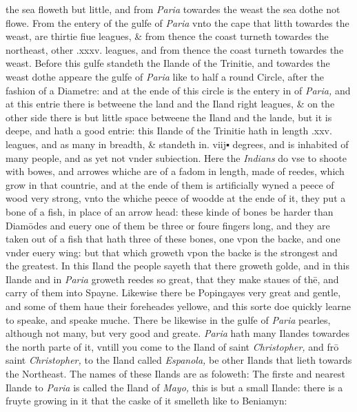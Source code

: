 \documentclass[11pt,twoside]{article}\makeatletter
\begin{document}
	\normalmarginpar
       the sea floweth but little, and from {\itshape Paria} towardes the weast the sea dothe not flowe. From the entery of the gulfe of {\itshape Pa­ria} vnto the cape that litth towardes the weast, are thirtie fiue leagues, \& from thence the coast turneth towardes the north­east, other .xxxv. leagues, and from thence the coast turneth towardes the weast. Before this gulfe standeth the Ilande 
	\normalmarginpar
       of the Trinitie, and towardes the weast dothe appeare the gulfe of {\itshape Paria} like to half a round Circle, after the fashion of a Diametre: and at the ende of this circle is the entery in of {\itshape Paria,} and at this entrie there is betweene the land and the I­land right leagues, \& on the other side there is but little space betweene the Iland and the lande, but it is deepe, and hath a good entrie: this Ilande of the Trinitie hath in length .xxv. leagues, and as many in breadth, \& standeth in. viij▪ degrees, and is inhabited of many people, and as yet not vnder sub­iection. Here the {\itshape Indians} do vse to shoote with bowes, and ar­rowes %
 whiche are of a fadom in length, made of reedes, which grow in that countrie, and at the ende of them is artificially wyned a peece of wood very strong, vnto the whiche peece of woodde at the ende of it, they put a bone of a fish, in place of an arrow head: these kinde of bones be harder than Diamōdes and euery one of them be three or foure fingers long, and they are taken out of a fish that hath three of these bones, one vpon the backe, and one vnder euery wing: but that which grow­eth vpon the backe is the strongest and the greatest. In this Iland the people sayeth that there groweth golde, and in this Ilande and in {\itshape Paria} groweth reedes so great, that they make staues of thē, and carry of them into Spayne. Likewise there be Popingayes very great and gentle, and some of them haue their foreheades yellowe, and this sorte doe quickly learne to speake, and speake muche. There be likewise in the gulfe of {\itshape Paria} pearles, although not many, but very good and greate. {\itshape Paria} hath many Ilandes towardes the north parte of it, vn­till you come to the Iland of saint {\itshape Christopher,} and frō saint {\itshape Christopher,} to the Iland called {\itshape Espanola,} be other Ilands that lieth towards the Northeast. The names of these Ilands are as foloweth: The firste and nearest Ilande to {\itshape Paria} is cal­led the Iland of {\itshape Mayo,} this is but a small Ilande: there is a fruyte growing in it that the caske of it smelleth like to Ben­iamyn: 
\end{document}
